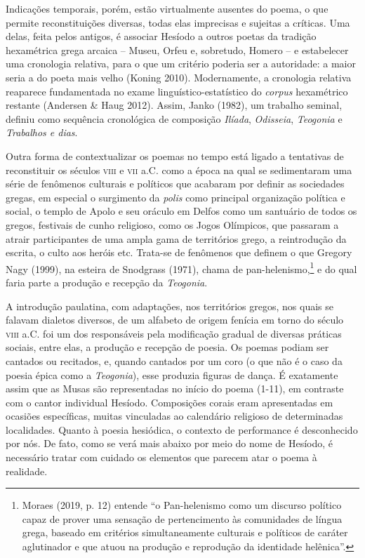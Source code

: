 Indicações temporais, porém, estão virtualmente ausentes do poema, o que
permite reconstituições diversas, todas elas imprecisas e sujeitas a
críticas. Uma delas, feita pelos antigos, é associar Hesíodo a outros
poetas da tradição hexamétrica grega arcaica -- Museu, Orfeu e,
sobretudo, Homero -- e estabelecer uma cronologia relativa, para o que
um critério poderia ser a autoridade: a maior seria a do poeta mais
velho (Koning 2010). Modernamente, a cronologia relativa reaparece
fundamentada no exame linguístico-estatístico do \emph{corpus}
hexamétrico restante (Andersen \& Haug 2012). Assim, Janko (1982), um
trabalho seminal, definiu como sequência cronológica de composição
\emph{Ilíada}, \emph{Odisseia}, \emph{Teogonia} e \emph{Trabalhos e
dias}.

Outra forma de contextualizar os poemas no tempo está ligado a
tentativas de reconstituir os séculos \textsc{viii} e \textsc{vii} a.C. como a época na
qual se sedimentaram uma série de fenômenos culturais e políticos que
acabaram por definir as sociedades gregas, em especial o surgimento da
\emph{polis} como principal organização política e social, o templo de
Apolo e seu oráculo em Delfos como um santuário de todos os gregos,
festivais de cunho religioso, como os Jogos Olímpicos, que passaram a
atrair participantes de uma ampla gama de territórios grego, a
reintrodução da escrita, o culto aos heróis etc. Trata-se de fenômenos
que definem o que Gregory Nagy (1999), na esteira de Snodgrass (1971),
chama de pan-helenismo,\footnote{Moraes (2019, p. 12) entende ``o
  Pan-helenismo como um discurso político capaz de prover uma sensação
  de pertencimento às comunidades de língua grega, baseado em critérios
  simultaneamente culturais e políticos de caráter aglutinador e que
  atuou na produção e reprodução da identidade helênica''.} e do qual
faria parte a produção e recepção da \emph{Teogonia}.

A introdução paulatina, com adaptações, nos territórios gregos, nos
quais se falavam dialetos diversos, de um alfabeto de origem fenícia em
torno do século \textsc{viii} a.C. foi um dos responsáveis pela modificação
gradual de diversas práticas sociais, entre elas, a produção e recepção
de poesia. Os poemas podiam ser cantados ou recitados, e, quando
cantados por um coro (o que não é o caso da poesia épica como a
\emph{Teogonia}), esse produzia figuras de dança. É exatamente assim que
as Musas são representadas no início do poema (1-11), em contraste com o
cantor individual Hesíodo. Composições corais eram apresentadas em
ocasiões específicas, muitas vinculadas ao calendário religioso de
determinadas localidades. Quanto à poesia hesiódica, o contexto de
performance é desconhecido por nós. De fato, como se verá mais abaixo
por meio do nome de Hesíodo, é necessário tratar com cuidado os
elementos que parecem atar o poema à realidade.

